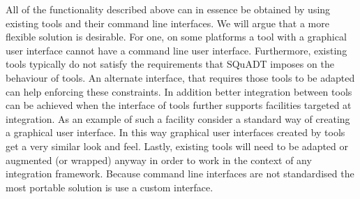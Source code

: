 \documentclass{article}
\newcommand{\squadt}{SQuADT\xspace}
\begin{document}
  


  All of the functionality described above can in essence be obtained by using
  existing tools and their command line interfaces. We will argue that a more
  flexible solution is desirable. For one, on some platforms a tool with a
  graphical user interface cannot have a command line user interface.
  Furthermore, existing tools typically do not satisfy the requirements that
  \squadt imposes on the behaviour of tools. An alternate interface, that
  requires those tools to be adapted can help enforcing these constraints.
  In addition better integration between tools can be achieved when the
  interface of tools further supports facilities targeted at integration. As an
  example of such a facility consider a standard way of creating a graphical
  user interface. In this way graphical user interfaces created by tools get a
  very similar look and feel.  Lastly, existing tools will need to be adapted
  or augmented (or wrapped) anyway in order to work in the context of any
  integration framework. Because command line interfaces are not standardised
  the most portable solution is use a custom interface.
 
\end{document}
